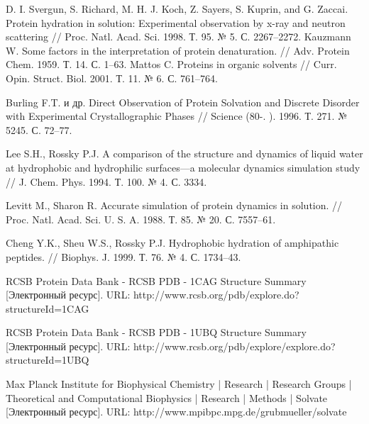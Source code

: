 \documentclass[a4paper]{article}
\begin{document}
\begin{thebibliography}{99}
 D. I. Svergun, S. Richard, M. H. J. Koch, Z. Sayers, S. Kuprin, and G. Zaccai. Protein hydration in solution: Experimental observation by x-ray and neutron scattering // Proc. Natl. Acad. Sci. 1998. Т. 95. № 5. С. 2267–2272.
 Kauzmann W. Some factors in the interpretation of protein denaturation. // Adv. Protein Chem. 1959. Т. 14. С. 1–63.
 Mattos C. Proteins in organic solvents // Curr. Opin. Struct. Biol. 2001. Т. 11. № 6. С. 761–764.


 Burling F.T. и др. Direct Observation of Protein Solvation and Discrete Disorder with Experimental Crystallographic Phases // Science (80-. ). 1996. Т. 271. № 5245. С. 72–77.

  Lee S.H., Rossky P.J. A comparison of the structure and dynamics of liquid water at hydrophobic and hydrophilic surfaces—a molecular dynamics simulation study // J. Chem. Phys. 1994. Т. 100. № 4. С. 3334.

  Levitt M., Sharon R. Accurate simulation of protein dynamics in solution. // Proc. Natl. Acad. Sci. U. S. A. 1988. Т. 85. № 20. С. 7557–61.

 Cheng Y.K., Sheu W.S., Rossky P.J. Hydrophobic hydration of amphipathic peptides. // Biophys. J. 1999. Т. 76. № 4. С. 1734–43.

 RCSB Protein Data Bank - RCSB PDB - 1CAG Structure Summary [Электронный ресурс]. URL: http://www.rcsb.org/pdb/explore.do?structureId=1CAG

 RCSB Protein Data Bank - RCSB PDB - 1UBQ Structure Summary [Электронный ресурс]. URL: http://www.rcsb.org/pdb/explore/explore.do?structureId=1UBQ

 Max Planck Institute for Biophysical Chemistry | Research | Research Groups | Theoretical and Computational Biophysics | Research | Methods | Solvate [Электронный ресурс]. URL: http://www.mpibpc.mpg.de/grubmueller/solvate

\end{thebibliography}
\end{document}
